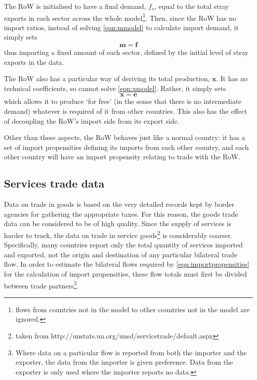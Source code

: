 \documentclass{article}
\begin{document}
The RoW is initialised to have a final demand, $f_s$, equal to the total stray exports in each sector across the whole model\footnote{flows from countries not in the model to other countries not in the model are ignored.}. Then, since the RoW has no import ratios, instead of solving \cref{eqn:mmodel} to calculate import demand, it simply sets
\begin{equation}\label{eqn:RoW_imports}
\boldsymbol{m} = \boldsymbol{f}
\end{equation}
thus importing a fixed amount of each sector, defined by the initial level of stray exports in the data.

The RoW also has a particular way of deriving its total production, $\boldsymbol{x}$. It has no technical coefficients, so cannot solve \cref{eqn:xmodel}. Rather, it simply sets
\begin{equation}\label{eqn:RoW_total_production}
\boldsymbol{x} = \boldsymbol{e}
\end{equation}
which allows it to produce `for free' (in the sense that there is no intermediate demand) whatever is required of it from other countries. This also has the effect of decoupling the RoW's import side from its export side.

Other than these aspects, the RoW behaves just like a normal country: it has a set of import propensities defining its imports from each other country, and each other country will have an import propensity relating to trade with the RoW.

\subsection{Services trade data}
Data on trade in goods is based on the very detailed records kept by border agencies for gathering the appropriate taxes.
For this reason, the goods trade data can be considered to be of high quality.
Since the supply of services is harder to track, the data on trade in service goods\footnote{taken from http://unstats.un.org/unsd/servicetrade/default.aspx} is considerably coarser.
Specifically, many countries report only the total quantity of services imported and exported, not the origin and destination of any particular bilateral trade flow.
In order to estimate the bilateral flows required by \cref{eqn:importpropensities} for the calculation of import propensities, these flow totals must first be divided between trade partners\footnote{Where data on a particular flow is reported from both the importer and the exporter, the data from the importer is given preference.
Data from the exporter is only used where the importer reports no data.}.
\end{document}
